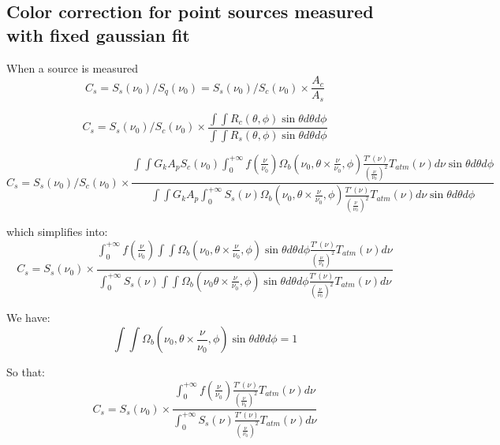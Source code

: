 \subsection{Color correction for point sources measured with fixed
  gaussian fit}
\label{ap:color_correction_HA}

When a source is measured 
\begin{equation} 
C_{s} = S_{s} (\nu_{0}) / S_{q}(\nu_{0}) = S_{s}(\nu_0) / S_{c} (\nu_{0})  \times \frac{A_{c}}{A_{s}}
\end{equation}

\begin{equation} 
C_{s} = S_{s}(\nu_{0}) / S_{c} (\nu_{0})  \times \frac{\int \int
R_{c}(\theta, \phi) \sin \theta d\theta d\phi }{\int \int
R_{s}(\theta, \phi) \sin \theta d\theta d\phi }
\end{equation}

\begin{equation}
C_{s} = S_{s}(\nu_{0}) / S_{c} (\nu_{0})  \times \frac{
  \int\int G_{k} A_{p} S_{c}(\nu_{0})\int_{0}^{+\infty} f(\frac{\nu}{\nu_{0}}) \Omega_{b}(\nu_{0}, \theta \times \frac{\nu}{\nu_{0}},
\phi) \frac{T'(\nu)}{\left(\frac{\nu}{\nu_{0}}\right)^{2}} 
T_{atm}(\nu) d\nu \sin \theta d\theta d\phi}
{\int \int G_{k}
A_{p} \int_{0}^{+\infty} S_{s}(\nu) \Omega_{b}(\nu_{0}, \theta \times \frac{\nu}{\nu_{0}},
\phi) \frac{T'(\nu)}{\left(\frac{\nu}{\nu_{0}}\right)^{2}} 
T_{atm}(\nu) d\nu \sin \theta d\theta d\phi
}
\end{equation}

which simplifies into:
\begin{equation}
C_{s} = S_{s}(\nu_{0})  \times \frac{
  \int_{0}^{+\infty} f(\frac{\nu}{\nu_{0}}) \int\int \Omega_{b}(\nu_{0}, \theta \times \frac{\nu}{\nu_{0}},
\phi)  \sin \theta d\theta d\phi \frac{T'(\nu)}{\left(\frac{\nu}{\nu_{0}}\right)^{2}} 
T_{atm}(\nu) d\nu}
{
\int_{0}^{+\infty} S_{s}(\nu) \int \int \Omega_{b}(\nu_{0} \theta \times \frac{\nu}{\nu_{0}},
\phi) \sin \theta  d\theta d\phi \frac{T'(\nu)}{\left(\frac{\nu}{\nu_{0}}\right)^{2}} 
T_{atm}(\nu) d\nu 
}
\end{equation}

We have:
\begin{equation}
\int\int \Omega_{b}(\nu_{0}, \theta \times \frac{\nu}{\nu_{0}},
\phi)  \sin \theta  d\theta d\phi = 1
\end{equation}

So that:
\begin{equation}
C_{s} = S_{s}(\nu_{0})  \times \frac{
  \int_{0}^{+\infty} f(\frac{\nu}{\nu_{0}}) \frac{T'(\nu)}{\left(\frac{\nu}{\nu_{0}}\right)^{2}} 
T_{atm}(\nu) d\nu}
{
\int_{0}^{+\infty} S_{s}(\nu)  \frac{T'(\nu)}{\left(\frac{\nu}{\nu_{0}}\right)^{2}} 
T_{atm}(\nu) d\nu 
}
\label{eq:color_corr_atm}
\end{equation}


